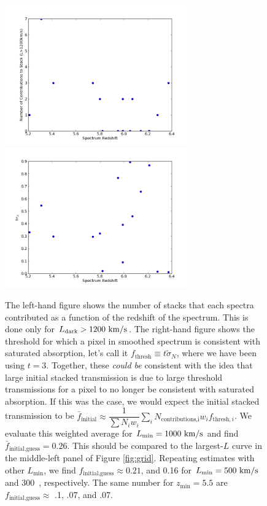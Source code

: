\documentclass[11pt]{article}
\begin{document}
\begin{figure}[h]
  \centering
  \includegraphics[width=8cm]{NcontributionsVsZ_1200min.png}
  \includegraphics[width=8cm]{ThresholdVsZ_1200min.png}
  \caption{The left-hand figure shows the number of stacks that each spectra contributed as a function of the redshift of the spectrum. This is done only for $L_{\text{dark}} > 1200\ \kms$. The right-hand figure shows the threshold for which a pixel in smoothed spectrum is consistent with saturated absorption, let's call it $f_{\text{thresh}} \equiv t \tilde{\sigma}_{N}$, where we have been using $t = 3$. Together, these \textit{could be} consistent with the idea that large initial stacked transmission is due to large threshold transmissions for a pixel to no longer be consistent with saturated absorption. If this was the case, we would expect the initial stacked transmission to be $\bar{f}_{\text{initial}} \approx \dfrac{1}{\sum N_i w_i} \sum_{i} N_{\text{contributions,i}} w_{i} f_{\text{thresh},i}$. We evaluate this weighted average for $L_{\text{min}} = 1000\ \text{km}/\text{s}$ and find $\bar{f}_{\text{initial,guess}} = 0.26$. This should be compared to the largest-$L$ curve in the middle-left panel of Figure \ref{fig:grid}. Repeating estimates with other $L_{\text{min}}$, we find $f_{\text{initial,guess}} \approx 0.21$, and 0.16 for $L_{\text{min}} = 500\ \kms$ and 300\ \kms, respectively. The same number for $z_{\text{min}} = 5.5$ are $f_{\text{initial,guess}} \approx $ .1, .07, and .07. }
  \label{fig:todo}
\end{figure}
\end{document}
